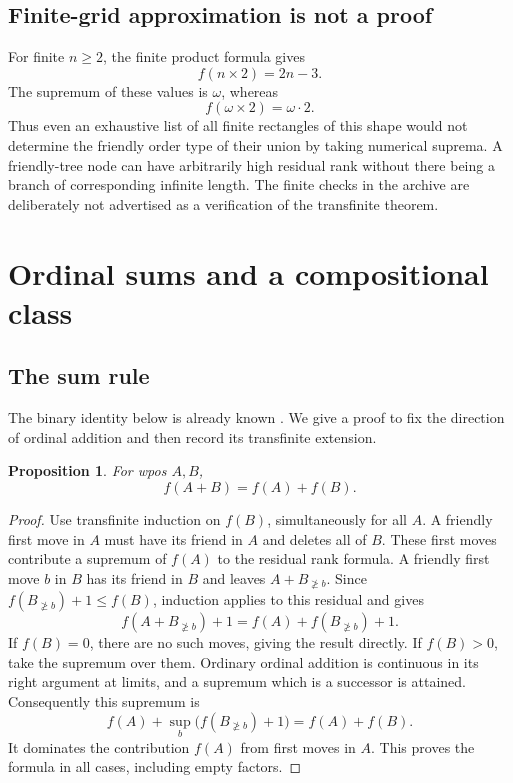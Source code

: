 \documentclass[11pt,letterpaper]{article}
\newtheorem{proposition}[theorem]{Proposition}
\theoremstyle{definition}
\theoremstyle{remark}
\newcommand{\res}[2]{#1_{\not\ge #2}}
\begin{document}
\subsection{Finite-grid approximation is not a proof}
For finite $n\ge2$, the finite product formula gives
\[
 f(n\times2)=2n-3.
\]
The supremum of these values is $\omega$, whereas
\[
 f(\omega\times2)=\omega\cdot2.
\]
Thus even an exhaustive list of all finite rectangles of this shape would
not determine the friendly order type of their union by taking numerical
suprema. A friendly-tree node can have arbitrarily high residual rank
without there being a branch of corresponding infinite length. The
finite checks in the archive are deliberately not advertised as a
verification of the transfinite theorem.

\section{Ordinal sums and a compositional class}\label{sec:sums}

\subsection{The sum rule}
The binary identity below is already known
\cite[Theorem~5.4.8(1)]{VialardThesis}. We give a proof to fix the direction
of ordinal addition and then record its transfinite extension.

\begin{proposition}\label{prop:binary-sum}
For wpos $A,B$,
\[
 f(A+B)=f(A)+f(B).
\]
\end{proposition}
\begin{proof}
Use transfinite induction on $f(B)$, simultaneously for all $A$. A
friendly first move in $A$ must have its friend in $A$ and deletes all of
$B$. These first moves contribute a supremum of $f(A)$ to the residual
rank formula. A friendly first move $b$ in $B$ has its friend in $B$ and
leaves $A+\res B b$. Since
$f(\res B b)+1\le f(B)$, induction applies to this residual and gives
\[
 f(A+\res B b)+1
   =f(A)+f(\res B b)+1.
\]
If $f(B)=0$, there are no such moves, giving the result directly. If
$f(B)>0$, take the supremum over them. Ordinary ordinal addition is
continuous in its right argument at limits, and a supremum which is a
successor is attained. Consequently this supremum is
\[
 f(A)+\sup_b\bigl(f(\res B b)+1\bigr)=f(A)+f(B).
\]
It dominates the contribution $f(A)$ from first moves in $A$. This proves
the formula in all cases, including empty factors.
\end{proof}
\end{document}
